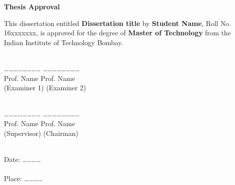 \documentclass[12pt, a4paper, twoside, openright]{Thesis} %
\begin{document}
{

\vspace{-1in}
\begin{center}
{\Large  {\bf Thesis Approval}}
\end{center}
\vspace*{0.1in} \noindent This dissertation entitled {\large \bf Dissertation title} by {\bf \large
Student Name}, Roll No. 16xxxxxxx, is approved for the degree of  {\large \bf Master of Technology} from the Indian Institute of Technology Bombay.\\\\

\vspace{3cm}

 \ldots\ldots \ldots\ldots \ldots\ldots \ldots\ldots  \hspace{2.5in}  \ldots\ldots \ldots\ldots \ldots\ldots \ldots\ldots \\
 \hspace*{1cm} Prof. Name \hspace{3.4in} Prof. Name\\
 \hspace*{0.9cm} (Examiner 1) \hspace{3.3in} (Examiner 2)\\\\

\vspace{2cm}

 \ldots\ldots \ldots\ldots \ldots\ldots \ldots\ldots  \hspace{2.5in}  \ldots\ldots \ldots\ldots \ldots\ldots \ldots\ldots \\
 \hspace*{1cm} Prof. Name \hspace{3.4in} Prof. Name\\
 \hspace*{0.9cm} (Supervisor) \hspace{3.39in} (Chairman)\\\\

\vspace{2cm}

\noindent
Date: \ldots\ldots \ldots \ldots\\\\
Place: \ldots\ldots \ldots \ldots


}
\end{document}
